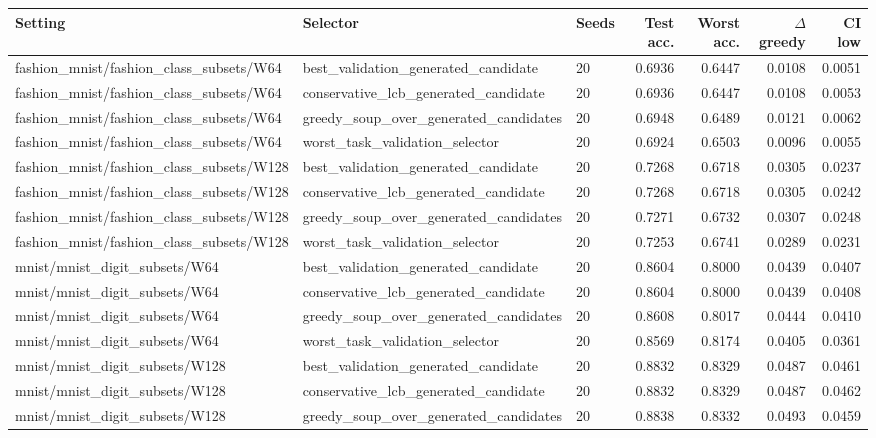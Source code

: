 \begin{tabular}{lllrrrr}
\toprule
Setting & Selector & Seeds & Test acc. & Worst acc. & $\Delta$ greedy & CI low \\
\midrule
fashion\_mnist/fashion\_class\_subsets/W64 & best\_validation\_generated\_candidate & 20 & 0.6936 & 0.6447 & 0.0108 & 0.0051 \\
fashion\_mnist/fashion\_class\_subsets/W64 & conservative\_lcb\_generated\_candidate & 20 & 0.6936 & 0.6447 & 0.0108 & 0.0053 \\
fashion\_mnist/fashion\_class\_subsets/W64 & greedy\_soup\_over\_generated\_candidates & 20 & 0.6948 & 0.6489 & 0.0121 & 0.0062 \\
fashion\_mnist/fashion\_class\_subsets/W64 & worst\_task\_validation\_selector & 20 & 0.6924 & 0.6503 & 0.0096 & 0.0055 \\
fashion\_mnist/fashion\_class\_subsets/W128 & best\_validation\_generated\_candidate & 20 & 0.7268 & 0.6718 & 0.0305 & 0.0237 \\
fashion\_mnist/fashion\_class\_subsets/W128 & conservative\_lcb\_generated\_candidate & 20 & 0.7268 & 0.6718 & 0.0305 & 0.0242 \\
fashion\_mnist/fashion\_class\_subsets/W128 & greedy\_soup\_over\_generated\_candidates & 20 & 0.7271 & 0.6732 & 0.0307 & 0.0248 \\
fashion\_mnist/fashion\_class\_subsets/W128 & worst\_task\_validation\_selector & 20 & 0.7253 & 0.6741 & 0.0289 & 0.0231 \\
mnist/mnist\_digit\_subsets/W64 & best\_validation\_generated\_candidate & 20 & 0.8604 & 0.8000 & 0.0439 & 0.0407 \\
mnist/mnist\_digit\_subsets/W64 & conservative\_lcb\_generated\_candidate & 20 & 0.8604 & 0.8000 & 0.0439 & 0.0408 \\
mnist/mnist\_digit\_subsets/W64 & greedy\_soup\_over\_generated\_candidates & 20 & 0.8608 & 0.8017 & 0.0444 & 0.0410 \\
mnist/mnist\_digit\_subsets/W64 & worst\_task\_validation\_selector & 20 & 0.8569 & 0.8174 & 0.0405 & 0.0361 \\
mnist/mnist\_digit\_subsets/W128 & best\_validation\_generated\_candidate & 20 & 0.8832 & 0.8329 & 0.0487 & 0.0461 \\
mnist/mnist\_digit\_subsets/W128 & conservative\_lcb\_generated\_candidate & 20 & 0.8832 & 0.8329 & 0.0487 & 0.0462 \\
mnist/mnist\_digit\_subsets/W128 & greedy\_soup\_over\_generated\_candidates & 20 & 0.8838 & 0.8332 & 0.0493 & 0.0459 \\

\end{tabular}
